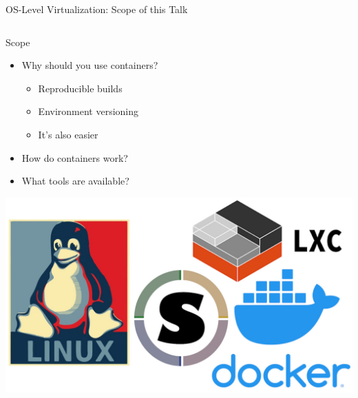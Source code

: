 \documentclass[10pt, compress, aspectratio=169, xcolor={table,usenames,dvipsnames}]{beamer}
\begin{document}
\begin{frame}[label={sec:org9dbaec6}]{OS-Level Virtualization: Scope of this Talk}
\begin{columns}
\begin{column}{0.4\columnwidth}
\begin{block}{Scope}
\begin{itemize}
\item Why should you \alert{use containers}?
\begin{itemize}
\item Reproducible builds
\item Environment versioning
\item It's also \alert{easier}
\end{itemize}
\item How do containers \alert{work}?
\item What \alert{tools} are available?
\end{itemize}

\begin{center}
\includegraphics[width=.8\columnwidth]{../../img/containers.jpg}
\end{center}
\end{block}
\end{column}


\end{columns}
\end{frame}
\end{document}
